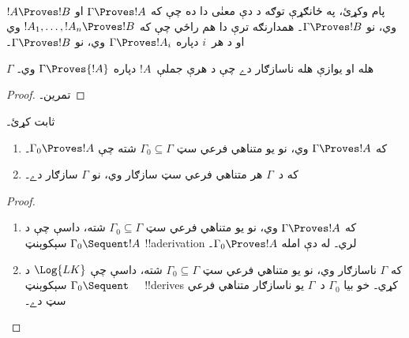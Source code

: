 \documentclass[../../../include/open-logic-section]{subfiles}
\begin{document}
پام وکړئ، په ځانګړې توګه د دې معنٰی دا ده چې که
$\Gamma \Proves !A$ او $!A \Proves !B$ وي، نو
$\Gamma \Proves !B$۔ همدارنګه ترې دا هم راځي چې که
$!A_1, \dots, !A_n \Proves !B$ وي او د هر~$i$ دپاره
$\Gamma \Proves !A_i$ وي، نو $\Gamma \Proves !B$۔

\begin{prop}
$\Gamma$ هله او يوازې هله ناسازګار دے چې د هرې جملې~$!A$ دپاره
$\Gamma \Proves {!A}$ وي۔
\end{prop}

\begin{proof}
تمرين۔
\end{proof}

\begin{prob}
 ثابت کړئ۔
\end{prob}

\begin{prop}
  \begin{enumerate}
  \item که $\Gamma \Proves !A$ وي، نو يو متناهي فرعي سټ
    $\Gamma_0 \subseteq \Gamma$ شته چې $\Gamma_0 \Proves !A$۔
  \item که د~$\Gamma$ هر متناهي فرعي سټ سازګار وي، نو $\Gamma$
    سازګار دے۔
  \end{enumerate}
\end{prop}

\begin{proof}
  \begin{enumerate}
    \item که $\Gamma \Proves !A$ وي، نو يو متناهي فرعي سټ
      $\Gamma_0 \subseteq \Gamma$ شته، داسې چې د
      $\Gamma_0 \Sequent !A$ سېکوېنټ !!a{derivation} لري۔ له دې امله
      $\Gamma_0 \Proves !A$۔
    \item که $\Gamma$ ناسازګار وي، نو يو متناهي فرعي سټ
      $\Gamma_0 \subseteq \Gamma$ شته، داسې چې $\Log{LK}$ د
      $\Gamma_0 \Sequent \quad$ سېکوېنټ !!{derive}s کړي۔ خو بيا
      $\Gamma_0$ د~$\Gamma$ يو ناسازګار متناهي فرعي سټ دے۔
  \end{enumerate}
\end{proof}
\end{document}
